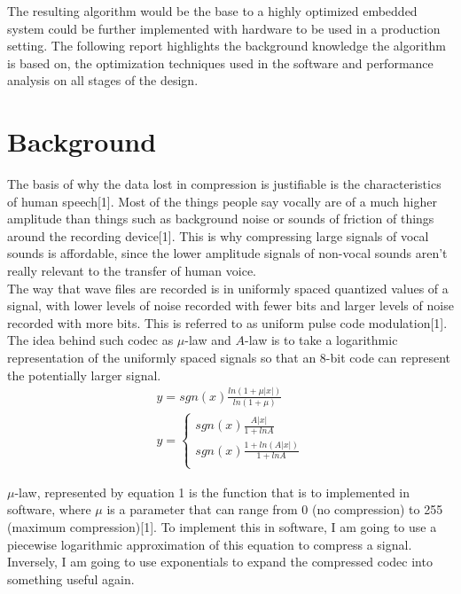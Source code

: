 \documentclass[12pt]{article}
\begin{document}
The resulting algorithm would be the base to a highly optimized embedded system could be further implemented with hardware to be used in a production setting. The following report highlights the background knowledge the algorithm is based on, the optimization techniques used in the software and performance analysis on all stages of the design.\\
 
\section{Background}

The basis of why the data lost in compression is justifiable is the characteristics of human speech[1]. Most of the things people say vocally are of a much higher amplitude than things such as background noise or sounds of friction of things around the recording device[1]. This is why compressing large signals of vocal sounds is affordable, since the lower amplitude signals of non-vocal sounds aren't really relevant to the transfer of human voice. \\

The way that wave files are recorded is in uniformly spaced quantized values of a signal, with lower levels of noise recorded with fewer bits and larger levels of noise recorded with more bits. This is referred to as uniform pulse code modulation[1]. The idea behind such codec as $\mu$-law and $A$-law is to take a logarithmic representation of the uniformly spaced signals so that an 8-bit code can represent the potentially larger signal. \\

\begin{align}
y = sgn(x)\frac{ln(1+\mu|x|)}{ln(1+ \mu)}\\
y = \begin{cases}
sgn(x)\frac{A|x|}{1+ln A} \\
sgn(x)\frac{1+ln(A|x|)}{1 + ln A}\\
\end{cases}
\end{align}

$\mu$-law, represented by equation 1 is the function that is to implemented in software, where $\mu$ is a parameter that can range from 0 (no compression) to 255 (maximum compression)[1]. To implement this in software, I am going to use a piecewise logarithmic approximation of this equation to compress a signal. Inversely, I am going to use exponentials to expand the compressed codec into something useful again. \\
\end{document}

